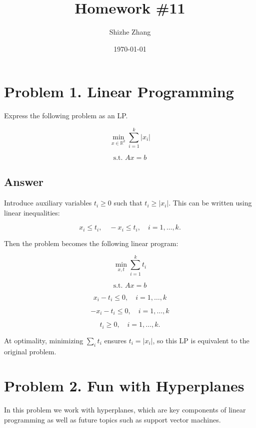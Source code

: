 \documentclass[
	12pt,
]{fphw}
\title{Homework \#11} %
\author{Shizhe Zhang} %
\date{\today} %
\institute{University of California, Berkeley \\ Department of Statistics} %
\begin{document}
\maketitle %


\section*{Problem 1. Linear Programming}

Express the following problem as an LP.

\[
\min_{x \in \mathbb{R}^k} \sum_{i=1}^{k} |x_i| \tag{1}
\]

\[
\text{s.t. } A x = b \tag{2}
\]

\subsection*{Answer}

Introduce auxiliary variables $t_i \ge 0$ such that $t_i \ge |x_i|$.
This can be written using linear inequalities:

\[
x_i \le t_i, \quad -x_i \le t_i, \quad i=1,\dots,k.
\]

Then the problem becomes the following linear program:

\[
\min_{x,t} \sum_{i=1}^{k} t_i
\]

\[
\text{s.t. } Ax = b
\]

\[
x_i - t_i \le 0, \quad i=1,\dots,k
\]

\[
-x_i - t_i \le 0, \quad i=1,\dots,k
\]

\[
t_i \ge 0, \quad i=1,\dots,k.
\]

At optimality, minimizing $\sum_i t_i$ ensures $t_i = |x_i|$, so this LP is equivalent to the original problem.





\newpage
\section*{Problem 2. Fun with Hyperplanes}

In this problem we work with hyperplanes, which are key components of linear programming as well as future
topics such as support vector machines.
\end{document}
